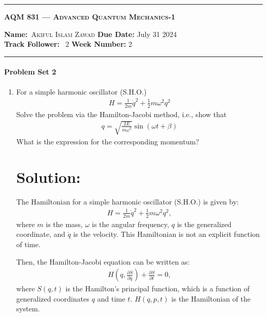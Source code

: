 \begin{center}
	\hrule
	\vspace{.4cm}
	\Large\scshape\textbf{AQM 831 --- Advanced Quantum Mechanics-1}
\end{center}
{\textbf{Name:}\ \textsc{Akiful Islam Zawad} \hspace{\hfill} \textbf{Due Date:} July 31 2024\\[5pt]
{ \textbf{Track Follower:}} \ 2 \hspace{\hfill} \textbf{Week Number:} 2 \\
	\hrule}
\paragraph*{Problem Set 2} %
\begin{enumerate}
    \item For a simple harmonic oscillator (S.H.O.)
        \begin{align*}
        H = \frac{1}{2m}\dot{q}^2 + \frac{1}{2}m\omega^2q^2
        \end{align*}
        Solve the problem via the Hamilton-Jacobi method, i.e., show that
        \begin{align*}
        q = \sqrt{\frac{2E}{m\omega^2}} \sin(\omega t + \beta)
        \end{align*}
        What is the expression for the corresponding momentum?
        \bigskip\bigskip\hline\hline\bigskip
\section*{Solution:}
The Hamiltonian for a simple harmonic oscillator (S.H.O.) is given by:
\begin{align}
    H = \frac{1}{2m}\dot{q}^2 + \frac{1}{2}m\omega^2q^2,\label{eq:hamiltonian-sho}
\end{align}
where $m$ is the mass, $\omega$ is the angular frequency, $q$ is the generalized coordinate, and $\dot{q}$ is the velocity. This Hamiltonian is not an explicit function of time.

Then, the Hamilton-Jacobi equation can be written as:
\begin{align}
    H\left(q, \frac{\partial S}{\partial q}\right) + \frac{\partial S}{\partial t} = 0,\label{eq:hamilton-jacobi-def}
\end{align}
where $S(q,t)$ is the Hamilton's principal function, which is a function of generalized coordinates $q$ and time $t$. $H(q,p,t)$ is the Hamiltonian of the system. 


\end{enumerate}

